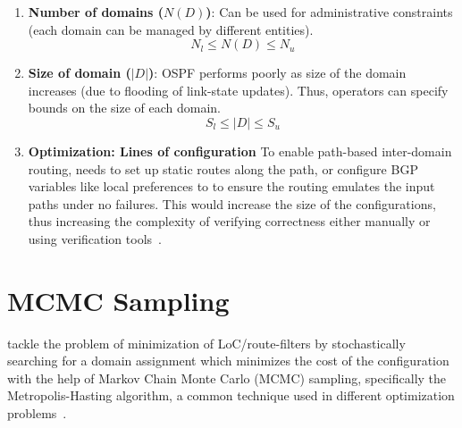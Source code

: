 \begin{enumerate}
	\item \textbf{Number of domains ($N(D)$)}: 
	Can be used for administrative constraints 
	(each domain can be managed by different
	entities). 
	\begin{equation}
	N_l \leq N(D) \leq N_u
	\end{equation}

	\item \textbf{Size of domain ($|D|$)}: OSPF
	performs poorly as size of the domain increases
	(due to flooding of link-state updates). Thus,
	operators can specify bounds on the size of each
	domain.
	\begin{equation}
	S_l \leq |D| \leq S_u
	\end{equation}


	\item \textbf{Optimization: Lines of configuration} 
	To enable path-based inter-domain routing, \name needs
	to set up static routes along the path, or configure BGP 
	variables like local preferences to 
	to ensure the routing emulates the input paths under no 
	failures. This would increase the size of the configurations,
	thus increasing the complexity of verifying correctness either 
	manually or using verification tools~\cite{batfish}. 

\end{enumerate}

\section{MCMC Sampling}
\name tackle the problem of minimization of LoC/route-filters
by stochastically searching for a domain assignment which 
minimizes the cost of the configuration with the help of Markov
Chain Monte Carlo (MCMC) sampling, specifically the Metropolis-Hasting
algorithm, a common technique used in different optimization 
problems~\cite{stoke}. 

